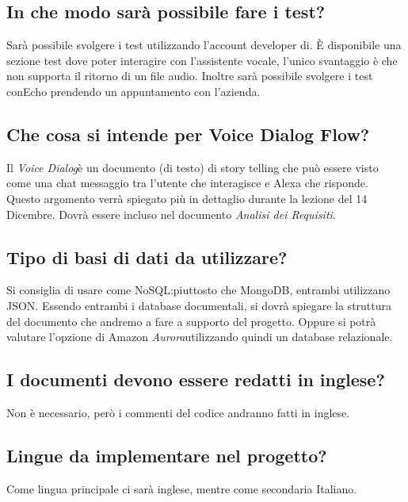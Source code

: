 \documentclass[a4paper,12pt]{article}
\begin{document}
	\subsection{In che modo sarà possibile fare i test?}
	Sarà possibile svolgere i test utilizzando l'account developer di. \`{E} disponibile una sezione test dove poter interagire con l'assistente vocale, l'unico svantaggio è che non supporta il ritorno di un file audio. Inoltre sarà possibile svolgere i test conEcho prendendo un appuntamento con l'azienda.

	\subsection{Che cosa si intende per Voice Dialog Flow?}
	Il \textit{Voice Dialog}è un documento (di testo) di story telling che può essere visto come una chat messaggio tra l'utente che interagisce e Alexa che risponde. \\
	Questo argomento verrà spiegato più in dettaglio durante la lezione del 14 Dicembre. Dovrà essere incluso nel documento \textit{Analisi dei Requisiti}.

	\subsection{Tipo di basi di dati da utilizzare?}
	Si consiglia di usare come NoSQL:piuttosto che MongoDB, entrambi utilizzano JSON. Essendo entrambi i database documentali, si dovrà spiegare la struttura del documento che andremo a fare a supporto del progetto. Oppure si potrà valutare l'opzione di Amazon \textit{Aurora}utilizzando quindi un database relazionale.

	\subsection{I documenti devono essere redatti in inglese?}
	Non è necessario, però i commenti del codice andranno fatti in inglese.

	\subsection{Lingue da implementare nel progetto?}
	Come lingua principale ci sarà inglese, mentre come secondaria Italiano.
\end{document}
